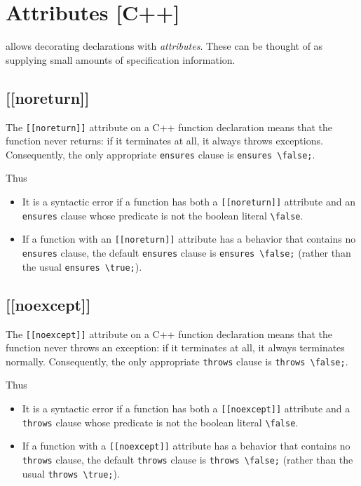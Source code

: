 \section{Attributes [C++]\textsl{}}
\label{sec:attributes}

\lang{} allows decorating declarations with \textit{attributes}. 
These can be thought of as supplying small amounts of specification information.

\subsection{[[noreturn]]}
\label{sec:noreturn}

The \lstinline|[[noreturn]]| attribute on a C++ function declaration means
that the function never returns: if it terminates at all, it always throws 
exceptions. Consequently, the only appropriate \lstinline|ensures| clause
is \lstinline|ensures \false;|.

Thus
\begin{itemize}
\item It is a syntactic error if a function has both a \lstinline|[[noreturn]]|
attribute and an \lstinline|ensures| clause whose predicate is not the 
boolean literal \lstinline|\false|.
\item If a function with an \lstinline|[[noreturn]]| attribute has a behavior
that contains no \lstinline|ensures| clause, the default \lstinline|ensures|
clause is \lstinline|ensures \false;| (rather than the usual \lstinline|ensures \true;|).
\end{itemize}

\subsection{[[noexcept]]}
\label{sec:nexcept}

The \lstinline|[[noexcept]]| attribute on a C++ function declaration means
that the function never throws an exception: if it terminates at all, it always terminates normally. Consequently, the only appropriate \lstinline|throws| clause
is \lstinline|throws \false;|.

Thus
\begin{itemize}
	\item It is a syntactic error if a function has both a \lstinline|[[noexcept]]|
	attribute and a \lstinline|throws| clause whose predicate is not the 
	boolean literal \lstinline|\false|.
	\item If a function with a \lstinline|[[noexcept]]| attribute has a behavior
	that contains no \lstinline|throws| clause, the default \lstinline|throws|
	clause is \lstinline|throws \false;| (rather than the usual \lstinline|throws \true;|).
\end{itemize}

